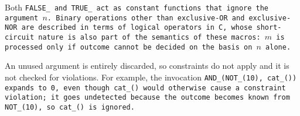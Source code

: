 \elbat

Both \tt{FALSE_} and \tt{TRUE_} act as
constant functions that ignore the argument $n$.
Binary operations other than exclusive-OR and exclusive-NOR
are described in terms of logical operators in C,
whose short-circuit nature is also part of the semantics of these macros:
$m$ is processed only if outcome cannot be decided on the basis on $n$ alone.

\note An unused argument is entirely discarded,
so constraints do not apply and it is not checked for violations.
For example, the invocation \tt{AND_(NOT_(10), cat_())} expands to \tt{0},
even though \tt{cat_()} would otherwise cause a constraint violation;
it goes undetected because the outcome becomes known from \tt{NOT_(10)},
so \tt{cat_()} is ignored.
